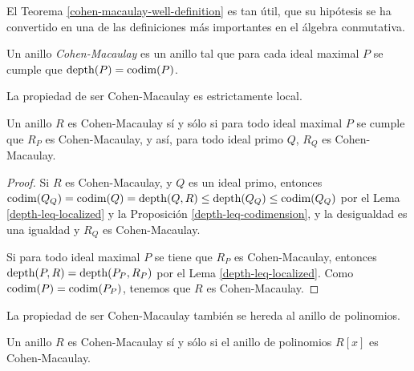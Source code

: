 El Teorema \ref{cohen-macaulay-well-definition} es tan útil, que su hipótesis se ha convertido en una de las definiciones más importantes en el álgebra conmutativa.

\begin{definition}
Un anillo \emph{Cohen-Macaulay} es un anillo tal que para cada ideal maximal $P$ se cumple que $\textrm{depth}(P) = \textrm{codim}(P)$.
\end{definition}

La propiedad de ser Cohen-Macaulay es estrictamente local.

\begin{proposition}\label{cohen-macaulay-iff-maximals}
Un anillo $R$ es Cohen-Macaulay sí y sólo si para todo ideal maximal $P$ se cumple que $R_P$ es Cohen-Macaulay, y así, para todo ideal primo $Q$, $R_Q$ es Cohen-Macaulay.
\end{proposition}

\begin{proof}
Si $R$ es Cohen-Macaulay, y $Q$ es un ideal primo, entonces $\textrm{codim}(Q_Q) = \textrm{codim}(Q) = \textrm{depth}(Q,R) \leq \textrm{depth}(Q_Q) \leq \textrm{codim}(Q_Q)$ por el Lema \ref{depth-leq-localized} y la Proposición \ref{depth-leq-codimension}, y la desigualdad es una igualdad y $R_Q$ es Cohen-Macaulay.

Si para todo ideal maximal $P$ se tiene que $R_P$ es Cohen-Macaulay, entonces $\textrm{depth}(P,R) = \textrm{depth}(P_P, R_P)$ por el Lema \ref{depth-leq-localized}. Como $\textrm{codim}(P) = \textrm{codim}(P_P)$, tenemos que $R$ es Cohen-Macaulay.
\end{proof}

La propiedad de ser Cohen-Macaulay también se hereda al anillo de polinomios.

\begin{proposition}
Un anillo $R$ es Cohen-Macaulay sí y sólo si el anillo de polinomios $R[x]$ es Cohen-Macaulay.
\end{proposition}

